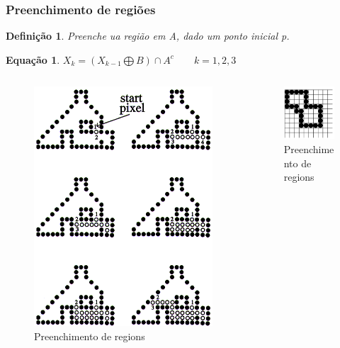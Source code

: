 \documentclass[aspectratio=169]{beamer}
\theoremstyle{Definition}
\newtheorem{defn}{Defini\c c\~ao}
\newtheorem{eq}[theorem]{Equa\c c\~ao}
\begin{document}
\begin{frame}
	\frametitle{Preenchimento de regiões}
	
	\begin{defn}
    	Preenche ua região em A, dado um ponto inicial p.
	\end{defn}
	
	\begin{eq}
    	$ X_k = ( X_{k-1} \bigoplus B) \cap A^c \qquad k = 1, 2, 3$   
	\end{eq}
	
	\begin{columns}
		\begin{column}{0.5\textwidth}
			\begin{figure}[h]
	  		 	\includegraphics[height=0.3\paperheight]{imagens/fill}
				\caption{Preenchimento de regions}\label{figLogical}
			\end{figure}
		\end{column}
		\begin{column}{0.5\textwidth}
			\begin{figure}[h]
			   	\includegraphics[width=4cm, height=0.3\paperheight]{imagens/fill2}
				\caption{Preenchimento de regions}\label{figLogical}
			\end{figure}
		\end{column}
	\end{columns}
	
\end{frame}
\end{document}
